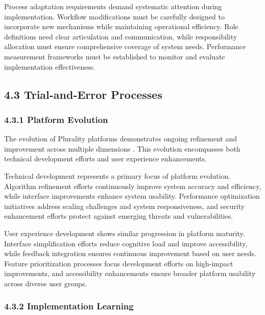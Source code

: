 Process adaptation requirements demand systematic attention during implementation. Workflow modifications must be carefully designed to incorporate new mechanisms while maintaining operational efficiency. Role definitions need clear articulation and communication, while responsibility allocation must ensure comprehensive coverage of system needs. Performance measurement frameworks must be established to monitor and evaluate implementation effectiveness.

\hypertarget{trial-and-error-processes}{%
\subsection{4.3 Trial-and-Error Processes}\label{trial-and-error-processes}}

\hypertarget{platform-evolution}{%
\subsubsection{4.3.1 Platform Evolution}\label{platform-evolution}}

The evolution of Plurality platforms demonstrates ongoing refinement and improvement across multiple dimensions \citep{communitynotes2024}. This evolution encompasses both technical development efforts and user experience enhancements.

Technical development represents a primary focus of platform evolution. Algorithm refinement efforts continuously improve system accuracy and efficiency, while interface improvements enhance system usability. Performance optimization initiatives address scaling challenges and system responsiveness, and security enhancement efforts protect against emerging threats and vulnerabilities.

User experience development shows similar progression in platform maturity. Interface simplification efforts reduce cognitive load and improve accessibility, while feedback integration ensures continuous improvement based on user needs. Feature prioritization processes focus development efforts on high-impact improvements, and accessibility enhancements ensure broader platform usability across diverse user groups.

\hypertarget{implementation-learning}{%
\subsubsection{4.3.2 Implementation Learning}\label{implementation-learning}}

